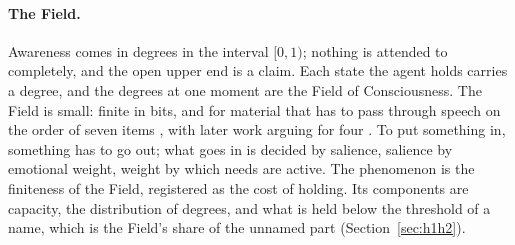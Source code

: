 \paragraph{The Field.}
\label{sec:field}
Awareness comes in degrees in the interval $[0,1)$; nothing is attended to completely, and the open
upper end is a claim. Each state the agent holds carries a degree, and the degrees at one moment are the
Field of Consciousness. The Field is small: finite in bits, and for material that has to pass through
speech on the order of seven items \citep{miller1956}, with later work arguing for four
\citep{cowan2001}. To put something in, something has to go out; what goes in is decided by salience,
salience by emotional weight, weight by which needs are active. The phenomenon is the finiteness of the
Field, registered as the cost of holding. Its components are capacity, the distribution of degrees, and
what is held below the threshold of a name, which is the Field's share of the unnamed part
(Section~\ref{sec:h1h2}).

